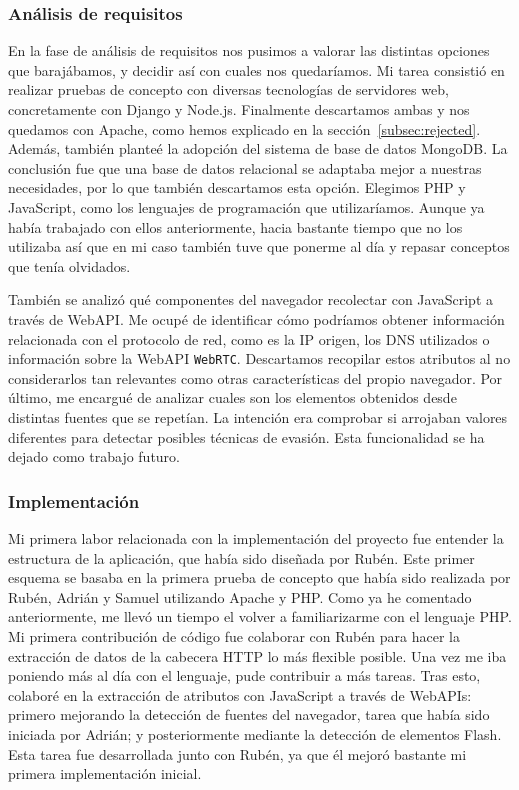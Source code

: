 \subsubsection{Análisis de requisitos}

En la fase de análisis de requisitos nos pusimos a valorar las distintas opciones que barajábamos, y decidir así con cuales nos quedaríamos. Mi tarea consistió en realizar pruebas de concepto con diversas tecnologías de servidores web, concretamente con Django y Node.js. Finalmente descartamos ambas y nos quedamos con Apache, como hemos explicado en la sección~\ref{subsec:rejected}. Además, también planteé la adopción del sistema de base de datos MongoDB. La conclusión fue que una base de datos relacional se adaptaba mejor a nuestras necesidades, por lo que también descartamos esta opción. Elegimos PHP y JavaScript, como los lenguajes de programación que utilizaríamos. Aunque ya había trabajado con ellos anteriormente, hacia bastante tiempo que no los utilizaba así que en mi caso también tuve que ponerme al día y repasar conceptos que tenía olvidados. \par 

También se analizó qué componentes del navegador recolectar con JavaScript a través de WebAPI. Me ocupé de identificar cómo podríamos obtener información relacionada con el protocolo de red, como es la IP origen, los DNS utilizados o información sobre la WebAPI \texttt{WebRTC}. Descartamos recopilar estos atributos al no considerarlos tan relevantes como otras características del propio navegador. Por último, me encargué de analizar cuales son los elementos obtenidos desde distintas fuentes que se repetían. La intención era comprobar si arrojaban valores diferentes para detectar posibles técnicas de evasión. Esta funcionalidad se ha dejado como trabajo futuro. \par 

\subsubsection{Implementación}

Mi primera labor relacionada con la implementación del proyecto fue entender la estructura de la aplicación, que había sido diseñada por Rubén. Este primer esquema se basaba en la primera prueba de concepto que había sido realizada por Rubén, Adrián y Samuel utilizando Apache y PHP. Como ya he comentado anteriormente, me llevó un tiempo el volver a familiarizarme con el lenguaje PHP. Mi primera contribución de código fue colaborar con Rubén para hacer la extracción de datos de la cabecera HTTP lo más flexible posible. Una vez me iba poniendo más al día con el lenguaje, pude contribuir a más tareas. Tras esto, colaboré en la extracción de atributos con JavaScript a través de WebAPIs: primero mejorando la detección de fuentes del navegador, tarea que había sido iniciada por Adrián; y posteriormente mediante la detección de elementos Flash. Esta tarea fue desarrollada junto con Rubén, ya que él mejoró bastante mi primera implementación inicial. \par 

